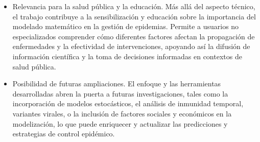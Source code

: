 \begin{itemize}
    \item Relevancia para la salud pública y la educación. Más allá del aspecto técnico, el trabajo contribuye a la sensibilización y educación sobre la importancia del modelado matemático en la gestión de epidemias. Permite a usuarios no especializados comprender cómo diferentes factores afectan la propagación de enfermedades y la efectividad de intervenciones, apoyando así la difusión de información científica y la toma de decisiones informadas en contextos de salud pública.
    \item Posibilidad de futuras ampliaciones. El enfoque y las herramientas desarrolladas abren la puerta a futuras investigaciones, tales como la incorporación de modelos estocásticos, el análisis de inmunidad temporal, variantes virales, o la inclusión de factores sociales y económicos en la modelización, lo que puede enriquecer y actualizar las predicciones y estrategias de control epidémico.
\end{itemize}










